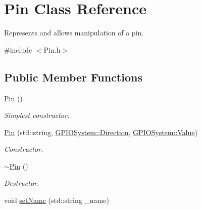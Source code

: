 \hypertarget{classPin}{\section{Pin Class Reference}
\label{classPin}
}


Represents and allows manipulation of a pin.  




{\ttfamily \#include $<$Pin.\-h$>$}

\subsection*{Public Member Functions}
\begin{DoxyCompactItemize}
\item 
\hypertarget{classPin_aaf3d92065cd9b9de91f01164bec418ea}{\hyperlink{classPin_aaf3d92065cd9b9de91f01164bec418ea}{Pin} ()}\label{classPin_aaf3d92065cd9b9de91f01164bec418ea}

\begin{DoxyCompactList}\small\item\em Simplest constructor. \end{DoxyCompactList}\item 
\hyperlink{classPin_ab8887a4248942998f241c0ea4f169aaf}{Pin} (std\-::string, \hyperlink{classGPIOSystem_ab7ef139a50e1e552a75578b539c7c34d}{G\-P\-I\-O\-System\-::\-Direction}, \hyperlink{classGPIOSystem_ace7a93165949f378a8ab04f8809e52f1}{G\-P\-I\-O\-System\-::\-Value})
\begin{DoxyCompactList}\small\item\em Constructor. \end{DoxyCompactList}\item 
\hypertarget{classPin_a462c14c45d3d653731dde638aa6e7bb7}{\hyperlink{classPin_a462c14c45d3d653731dde638aa6e7bb7}{$\sim$\-Pin} ()}\label{classPin_a462c14c45d3d653731dde638aa6e7bb7}

\begin{DoxyCompactList}\small\item\em Destructor. \end{DoxyCompactList}\item 
\hypertarget{classPin_a60899369709cdfb62661f2c1efde46b8}{void \hyperlink{classPin_a60899369709cdfb62661f2c1efde46b8}{set\-Name} (std\-::string \-\_\-name)}\label{classPin_a60899369709cdfb62661f2c1efde46b8}


\end{DoxyCompactItemize}
